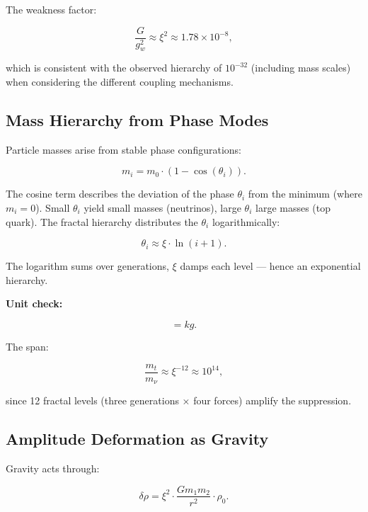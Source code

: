 	The weakness factor:
	
	\begin{equation}
		\frac{G}{g_w^2} \approx \xi^2 \approx 1.78 \times 10^{-8},
	\end{equation}
	
	which is consistent with the observed hierarchy of \(10^{-32}\) (including mass scales) when considering the different coupling mechanisms.
	
	\subsection*{Mass Hierarchy from Phase Modes}
	
	Particle masses arise from stable phase configurations:
	
	\begin{equation}
		m_i = m_0 \cdot (1 - \cos(\theta_i)).
	\end{equation}
	
	The cosine term describes the deviation of the phase \(\theta_i\) from the minimum (where \(m_i = 0\)). Small \(\theta_i\) yield small masses (neutrinos), large \(\theta_i\) large masses (top quark). The fractal hierarchy distributes the \(\theta_i\) logarithmically:
	
	\begin{equation}
		\theta_i \approx \xi \cdot \ln(i + 1).
	\end{equation}
	
	The logarithm sums over generations, \(\xi\) damps each level — hence an exponential hierarchy.
	
	\textbf{Unit check:}
	
	\begin{equation}
		[m_i] = \si{kg}.
	\end{equation}
	
	The span:
	
	\begin{equation}
		\frac{m_t}{m_\nu} \approx \xi^{-12} \approx 10^{14},
	\end{equation}
	
	since 12 fractal levels (three generations × four forces) amplify the suppression.
	
	\subsection*{Amplitude Deformation as Gravity}
	
	Gravity acts through:
	
	\begin{equation}
		\delta \rho = \xi^2 \cdot \frac{G m_1 m_2}{r^2} \cdot \rho_0.
	\end{equation}
	
